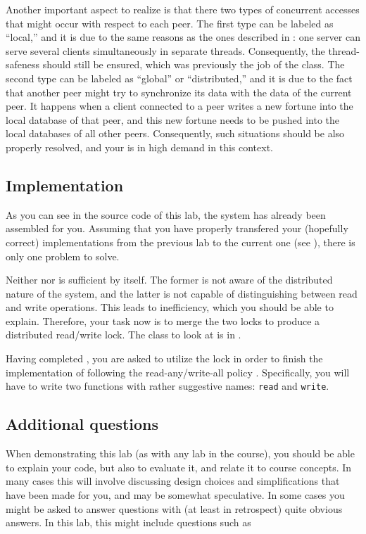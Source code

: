 \documentclass[a4paper]{article}
\begin{document}
Another important aspect to realize is that there two types of concurrent
accesses that might occur with respect to each peer. The first type can be
labeled as ``local,'' and it is due to the same reasons as the ones described in
: one server can serve several clients simultaneously in separate
threads. Consequently, the thread-safeness should still be ensured, which was
previously the job of the  class. The second type can
be labeled as ``global'' or ``distributed,'' and it is due to the fact that
another peer might try to synchronize its data with the data of the current
peer. It happens when a client connected to a peer writes a new fortune into the
local database of that peer, and this new fortune needs to be pushed into the
local databases of all other peers. Consequently, such situations should be also
properly resolved, and your  is in high demand in
this context.

\subsection{Implementation} 
As you can see in the source code of this lab, the system has already been
assembled for you. Assuming that you have properly transfered your (hopefully
correct) implementations from the previous lab to the current one (see
), there is only one problem to solve.

Neither  nor  is sufficient
by itself. The former is not aware of the distributed nature of the system, and
the latter is not capable of distinguishing between read and write operations.
This leads to inefficiency, which you should be able to explain. Therefore, your
task now is to merge the two locks to produce a distributed read/write lock. The
class to look at is  in
.

Having completed , you are asked to utilize
the lock in order to finish the implementation of 
following the read-any/write-all policy \cite{lecture8}. Specifically, you will
have to write two functions with rather suggestive names: \texttt{read} and
\texttt{write}.

\subsection{Additional questions}
When demonstrating this lab (as with any lab in the course), you
should be able to explain your code, but also to evaluate it, and
relate it to course concepts. In many cases this will involve
discussing design choices and simplifications that have been made for
you, and may be somewhat speculative. In some cases you might be asked
to answer questions with (at least in retrospect) quite obvious
answers. In this lab, this might include questions such as
\end{document}
